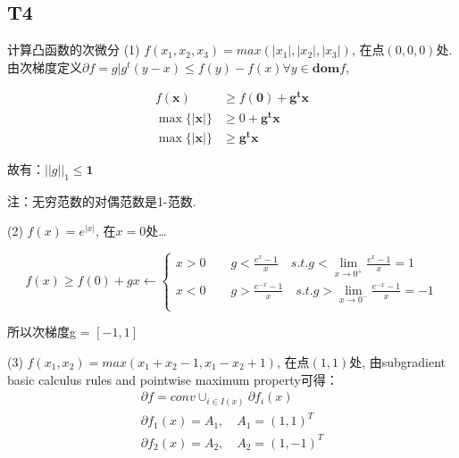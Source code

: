 \documentclass{article}
\begin{document}
    \subsection*{T4}
    计算凸函数的次微分
    (1) $f(x_1, x_2, x_3) = max(|x_1|, |x_2|, |x_3|)$, 在点$(0,0,0)$处. 
        由次梯度定义$\partial f = {g | g^t(y-x) \le f(y)-f(x)} \forall y \in \mathbf{dom} f$,

        \begin{align*}
            f(\mathbf{x}) &\ge f(\mathbf{0})+ \mathbf{g^t} \mathbf{x} \\
            \max \{ |\mathbf{x}| \} &\ge 0 + \mathbf{g^t} \mathbf{x}  \\
            \max \{ |\mathbf{x}| \} &\ge  \mathbf{g^t} \mathbf{x} 
        \end{align*}
        
        故有：$|| g||_1 \le \mathbf{1}$

        注：无穷范数的对偶范数是1-范数.

    (2) $f(x) = e^{|x|}$, 在$x=0$处\dots
        
        \begin{equation*}
            f(x) \ge f(0) + gx \leftarrow
            \begin{cases}
                x>0 \quad \quad g < \frac{e^x -1 }{x} \quad s.t. g< \lim_{x \to 0^+}\frac{e^x -1 }{x}  = 1\\
                x<0 \quad \quad g > \frac{e^{-x} -1 }{x} \quad s.t. g> \lim_{x \to 0^-}\frac{e^{-x} -1 }{x} = -1 \\
            \end{cases} 
        \end{equation*}

        所以次梯度g = $[-1,1]$
        
    (3) $f(x_1, x_2) = max (x_1+x_2-1, x_1-x_2+1)$, 在点$(1,1)$处,
        由subgradient basic calculus rules and pointwise maximum property可得：
        \begin{gather*}
            \partial f = conv \cup_{i \in I(x)} \partial f_i(x) \\
            \partial f_1(x) = A_1 , \quad A_1 = (1, 1)^T \\
            \partial f_2(x) = A_2 , \quad A_2 = (1, -1)^T \\
        \end{gather*}
\end{document}
